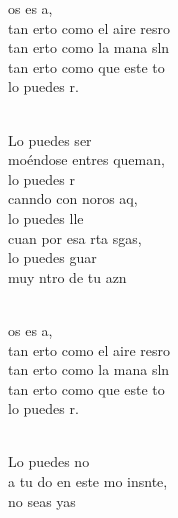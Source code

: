 \begin{cancion}%
	\begin{chorus}%
	os es a, \\
	tan erto como el aire  resro\\
	tan erto como la mana sln\\
	tan erto como que este to \\
	lo puedes r. \\
	\end{chorus}%
	\jump\\
	Lo puedes ser\\
	moéndose entres queman,\\
	lo puedes r\\
	canndo con noros aq, \\
	lo puedes lle\\
	cuan por esa rta sgas,\\
	lo puedes guar\\
	muy ntro de tu azn\\\jump\\
	\begin{chorus}%
	os es a, \\
	tan erto como el aire  resro\\
	tan erto como la mana sln\\
	tan erto como que este to \\
	lo puedes r. \\
	\end{chorus}%
	\jump\\
	Lo puedes no\\
	a tu do en este mo insnte,\\
	no seas yas \\

\end{cancion}
